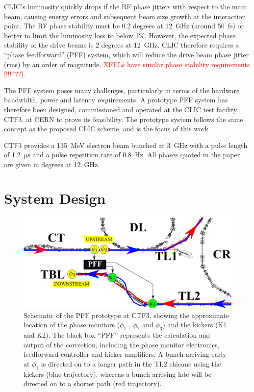 \documentclass[%
 reprint,
 amsmath,amssymb,
 prl,
]{revtex4-1}
\begin{document}
CLIC's luminosity quickly drops if the RF phase jitters with respect to the 
main beam, causing energy errors and subsequent beam size growth at the 
interaction point. The RF phase 
stability must be 0.2 degrees at 12~GHz (around 50~fs) or better to limit the luminosity loss 
to below 1\%.  However, the expected phase stability of the drive beams is 2 
degrees at 12~GHz. CLIC therefore requires a ``phase feedforward'' (PFF) 
system, which will reduce the drive beam phase jitter (rms) by an order of 
magnitude. \textcolor{red}{XFELs have similar phase stability requirements [!!!???].}

The PFF system poses many challenges, particularly in terms of the hardware 
bandwidth, power and latency requirements. A prototype PFF system has therefore 
been designed, commissioned and operated at the CLIC 
test facility CTF3, at CERN to prove its feasibility. The prototype system 
follows the same concept as the proposed CLIC scheme, and is the focus of this 
work. 

CTF3 provides a 135~MeV electron beam bunched at 3~GHz with a pulse length of 
1.2~\(\mathrm{\mu s}\) and a pulse repetition rate of 0.8~Hz. All phases quoted 
in the paper are given in degrees at 12~GHz.

\section{\label{s:ctfLayout}System Design}

\begin{figure}
	\includegraphics[width=\textwidth]{figs/ctfpffLayout}%
	\caption{\label{fig:pffLayout}Schematic of the PFF prototype at CTF3, 
	showing the approximate location of the phase monitors (\(\phi_1\) , 
	\(\phi_2\) and \(\phi_3\)) and
		the kickers (K1 and K2). The black box “PFF” represents the calculation 
		and output of the correction, including the phase monitor
		electronics, feedforward controller and kicker amplifiers. A bunch 
		arriving early at \(\phi_1\) is directed on to a longer path in the TL2 
		chicane
		using the kickers (blue trajectory), whereas a bunch arriving late will 
		be directed on to a shorter path (red trajectory). }
\end{figure}
\end{document}
